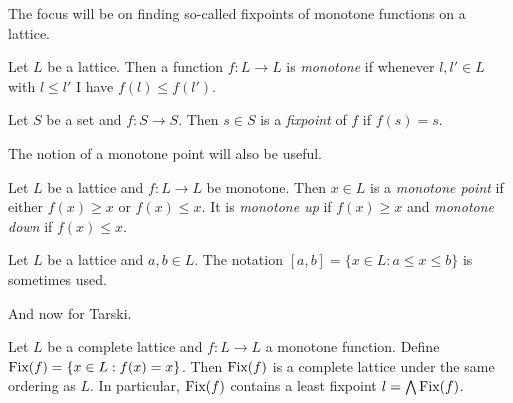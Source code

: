 The focus will be on finding so-called fixpoints of monotone functions on a lattice.
\begin{definition}
  Let $L$ be a lattice. Then a function $f : L \to L$ is \emph{monotone} if whenever $l, l' \in L$ with
  $l \leq l'$ I have $f(l) \leq f(l')$.
\end{definition}
\begin{definition}[Fixpoint]
  Let $S$ be a set and $f : S \to S$. Then $s \in S$ is a \emph{fixpoint} of $f$ if $f(s) = s$.
\end{definition}
The notion of a monotone point will also be useful.
\begin{definition}
  Let $L$ be a lattice and $f : L \to L$ be monotone. Then $x \in L$ is a \emph{monotone point}
  if either $f(x) \geq x$ or $f(x) \leq x$. It is \emph{monotone up} if $f(x) \geq x$ and \emph{monotone
  down} if $f(x) \leq x$.
\end{definition}
\begin{notation}
  Let $L$ be a lattice and $a, b \in L$. The notation $[a, b] = \{x \in L : a \leq x \leq b\}$ is sometimes
  used.
\end{notation}
And now for Tarski.
\begin{theorem}
  Let $L$ be a complete lattice and $f : L \to L$ a monotone function. Define 
  $\text{Fix}(f) = \{x \in L : f(x) = x\}$. Then $\text{Fix}(f)$ is a complete lattice under
  the same ordering as $L$. In particular, $\text{Fix}(f)$ contains a least fixpoint $l = \bigwedge \text{Fix}(f)$.
\end{theorem}
